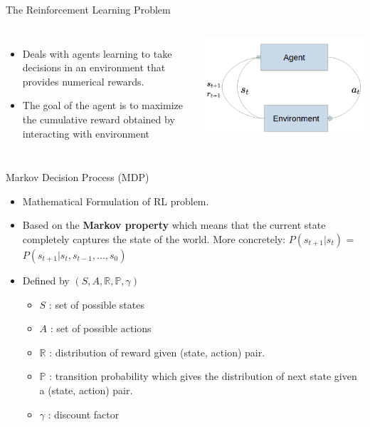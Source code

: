 \begin{frame}{The Reinforcement Learning Problem}
\begin{columns}
\begin{itemize}
\item Deals with agents learning to take decisions in an environment that provides numerical rewards.
\item The goal of the agent is to maximize the cumulative reward obtained by interacting with environment
\end{itemize}

\centering
\includegraphics[scale = 0.25]{img/block.png}
\end{columns}
\end{frame}
\begin{frame}{Markov Decision Process (MDP)}
\begin{itemize}
    \item Mathematical Formulation of RL problem.
    \item Based on the \textbf{Markov property} which means that the current state completely captures the state of the world. More concretely:
    $P(s_{t+1}|s_t)$ = $P(s_{t+1}|s_t, s_{t-1}, ..., s_0)$ \item Defined by $(S, A, \mathbb{R},  \mathbb{P}, \gamma)$ 
    \begin{itemize}
        \item $S$ : set of possible states
        \item $A$ : set of possible actions
        \item $\mathbb{R}$ : distribution of reward given (state, action) pair. 
        \item $\mathbb{P}$ : transition probability which gives the distribution of next state given a (state, action) pair. 
        \item $\gamma$ : discount factor
    \end{itemize}
\end{itemize}
    
\end{frame}
